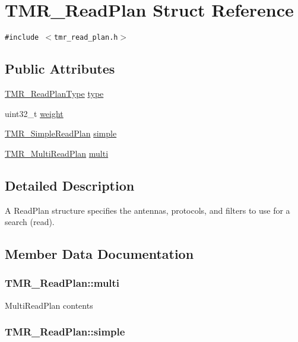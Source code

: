 \hypertarget{struct_t_m_r___read_plan}{
\section{TMR\_\-ReadPlan Struct Reference}
\label{struct_t_m_r___read_plan}
}
{\tt \#include $<$tmr\_\-read\_\-plan.h$>$}

\subsection*{Public Attributes}
\begin{CompactItemize}
\item 
\hyperlink{group__readplan_g4646d0bb9359362ac44e57f04f7e429c}{TMR\_\-ReadPlanType} \hyperlink{struct_t_m_r___read_plan_8044ba60e3984ed8fb04fa9d5a8bdd6e}{type}
\item 
uint32\_\-t \hyperlink{struct_t_m_r___read_plan_cc08065d1c7ccb361156c42d56647099}{weight}
\item 
\hyperlink{struct_t_m_r___simple_read_plan}{TMR\_\-SimpleReadPlan} \hyperlink{struct_t_m_r___read_plan_725dd9a75e557ec4747f17f1cfa68c51}{simple}
\item 
\hyperlink{struct_t_m_r___multi_read_plan}{TMR\_\-MultiReadPlan} \hyperlink{struct_t_m_r___read_plan_2ab1b5f103b6c340882505cf889e01df}{multi}
\end{CompactItemize}


\subsection{Detailed Description}
A ReadPlan structure specifies the antennas, protocols, and filters to use for a search (read). 

\subsection{Member Data Documentation}
\hypertarget{struct_t_m_r___read_plan_2ab1b5f103b6c340882505cf889e01df}{
\subsubsection[{multi}]{ {\bf TMR\_\-ReadPlan::multi}}}
\label{struct_t_m_r___read_plan_2ab1b5f103b6c340882505cf889e01df}


MultiReadPlan contents \hypertarget{struct_t_m_r___read_plan_725dd9a75e557ec4747f17f1cfa68c51}{
\subsubsection[{simple}]{ {\bf TMR\_\-ReadPlan::simple}}}
\label{struct_t_m_r___read_plan_725dd9a75e557ec4747f17f1cfa68c51}


